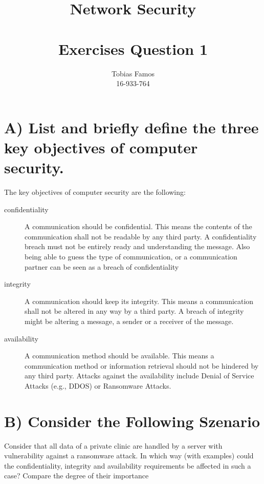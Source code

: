 \documentclass[11pt,a4paper]{article}
\title{Network Security \\ ~\\ \Large{Exercises Question 1}}
\author{Tobias Famos\\ 16-933-764}
\begin{document}
    \maketitle
    \section*{A) List and briefly define the three key objectives of computer security.}
    The key objectives of computer security are the following:
    \begin{description}
        \item [confidentiality] A communication should be confidential.
        This means the contents of the communication shall not be readable by any third party.
        A confidentiality breach must not be entirely ready and understanding the message.
        Also being able to guess the type of communication, or a communication partner can be seen as a breach of confidentiality
        \item[integrity] A communication should keep its integrity.
        This means a communication shall not be altered in any way by a third party.
        A breach of integrity might be altering a message, a sender or a receiver of the message.
        \item[availability] A communication method should be available.
        This means a communication method or information retrieval should not be hindered by any third party.
        Attacks against the availability include Denial of Service Attacks (e.g., DDOS) or Ransomware Attacks.
    \end{description}

    \section*{B)  Consider the Following Szenario}
    Consider that all data of a private clinic are handled by a server with vulnerability against a ransomware attack.
    In which way (with examples) could the confidentiality, integrity and availability requirements be affected in such a case?
    Compare the degree of their importance
\end{document}
